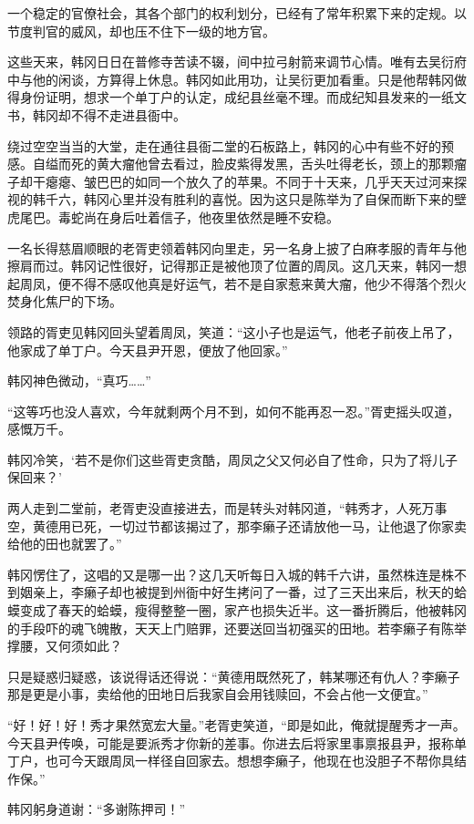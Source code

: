 一个稳定的官僚社会，其各个部门的权利划分，已经有了常年积累下来的定规。以节度判官的威风，却也压不住下一级的地方官。

这些天来，韩冈日日在普修寺苦读不辍，间中拉弓射箭来调节心情。唯有去吴衍府中与他的闲谈，方算得上休息。韩冈如此用功，让吴衍更加看重。只是他帮韩冈做得身份证明，想求一个单丁户的认定，成纪县丝毫不理。而成纪知县发来的一纸文书，韩冈却不得不走进县衙中。

绕过空空当当的大堂，走在通往县衙二堂的石板路上，韩冈的心中有些不好的预感。自缢而死的黄大瘤他曾去看过，脸皮紫得发黑，舌头吐得老长，颈上的那颗瘤子却干瘪瘪、皱巴巴的如同一个放久了的苹果。不同于十天来，几乎天天过河来探视的韩千六，韩冈心里并没有胜利的喜悦。因为这只是陈举为了自保而断下来的壁虎尾巴。毒蛇尚在身后吐着信子，他夜里依然是睡不安稳。

一名长得慈眉顺眼的老胥吏领着韩冈向里走，另一名身上披了白麻孝服的青年与他擦肩而过。韩冈记性很好，记得那正是被他顶了位置的周凤。这几天来，韩冈一想起周凤，便不得不感叹他真是好运气，若不是自家惹来黄大瘤，他少不得落个烈火焚身化焦尸的下场。

领路的胥吏见韩冈回头望着周凤，笑道：“这小子也是运气，他老子前夜上吊了，他家成了单丁户。今天县尹开恩，便放了他回家。”

韩冈神色微动，“真巧……”

“这等巧也没人喜欢，今年就剩两个月不到，如何不能再忍一忍。”胥吏摇头叹道，感慨万千。

韩冈冷笑，‘若不是你们这些胥吏贪酷，周凤之父又何必自了性命，只为了将儿子保回来？’

两人走到二堂前，老胥吏没直接进去，而是转头对韩冈道，“韩秀才，人死万事空，黄德用已死，一切过节都该揭过了，那李癞子还请放他一马，让他退了你家卖给他的田也就罢了。”

韩冈愣住了，这唱的又是哪一出？这几天听每日入城的韩千六讲，虽然株连是株不到姻亲上，李癞子却也被提到州衙中好生拷问了一番，过了三天出来后，秋天的蛤蟆变成了春天的蛤蟆，瘦得整整一圈，家产也损失近半。这一番折腾后，他被韩冈的手段吓的魂飞魄散，天天上门赔罪，还要送回当初强买的田地。若李癞子有陈举撑腰，又何须如此？

只是疑惑归疑惑，该说得话还得说：“黄德用既然死了，韩某哪还有仇人？李癞子那是更是小事，卖给他的田地日后我家自会用钱赎回，不会占他一文便宜。”

“好！好！好！秀才果然宽宏大量。”老胥吏笑道，“即是如此，俺就提醒秀才一声。今天县尹传唤，可能是要派秀才你新的差事。你进去后将家里事禀报县尹，报称单丁户，也可今天跟周凤一样径自回家去。想想李癞子，他现在也没胆子不帮你具结作保。”

韩冈躬身道谢：“多谢陈押司！”

